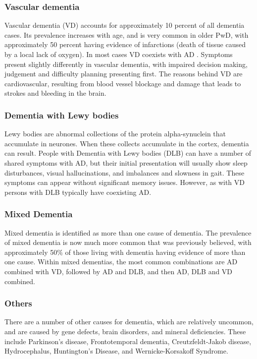 \subsubsection{Vascular dementia}
Vascular dementia (VD) accounts for approximately 10 percent of all dementia cases. Its prevalence increases with age, and is very common in older PwD, with approximately 50 percent having evidence of infarctions (death of tissue caused by a local lack of oxygen). In most cases VD coexists with AD \cite{2015AlzheimersDiseaseFactsFigures}.
Symptoms present slightly differently in vascular dementia, with impaired decision making, judgement and difficulty planning presenting first. The reasons behind VD are cardiovascular, resulting from blood vessel blockage and damage that leads to strokes and bleeding in the brain.

\subsubsection{Dementia with Lewy bodies }
Lewy bodies are abnormal collections of the protein alpha-synuclein that accumulate in neurones. When these collects accumulate in the cortex, dementia can result. People with Dementia with Lewy bodies (DLB) can have a number of shared symptoms with AD, but their initial presentation will usually show sleep disturbances, visual hallucinations, and imbalances and slowness in gait. These symptoms can appear without significant memory issues. However, as with VD persons with DLB typically have coexisting AD.

\subsubsection{Mixed Dementia}
Mixed dementia is identified as more than one cause of dementia. The prevalence of mixed dementia is now much more common that was previously believed, with approximately 50\% of those living with dementia having evidence of more than one cause. Within mixed dementias, the most common combinations are AD combined with VD, followed by AD and DLB, and then AD, DLB and VD combined.

\subsubsection{Others}
There are a number of other causes for dementia, which are relatively uncommon, and are caused by gene defects, brain disorders, and mineral deficiencies. These include Parkinson's disease, Frontotemporal dementia, Creutzfeldt-Jakob disease, Hydrocephalus, Huntington's Disease, and Wernicke-Korsakoff Syndrome.

